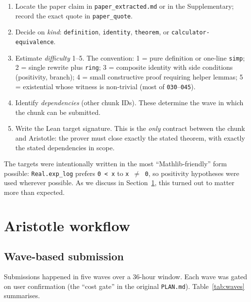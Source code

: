 \documentclass[11pt,a4paper]{article}
\theoremstyle{plain}
\theoremstyle{definition}
\begin{document}
\begin{enumerate}[leftmargin=*]
\item Locate the paper claim in \texttt{paper\_extracted.md} or in the
Supplementary; record the exact quote in \texttt{paper\_quote}.
\item Decide on \emph{kind}: \texttt{definition},
\texttt{identity}, \texttt{theorem}, or
\texttt{calculator-equivalence}.
\item Estimate \emph{difficulty} 1--5.  The convention: 1 = pure
definition or one-line \texttt{simp}; 2 = single rewrite plus
\texttt{ring}; 3 = composite identity with side conditions
(positivity, branch); 4 = small constructive proof requiring helper
lemmas; 5 = existential whose witness is non-trivial (most of
\texttt{030}--\texttt{045}).
\item Identify \emph{dependencies} (other chunk IDs).  These determine
the wave in which the chunk can be submitted.
\item Write the Lean target signature.  This is the \emph{only} contract
between the chunk and Aristotle: the prover must close exactly the
stated theorem, with exactly the stated dependencies in scope.
\end{enumerate}

The targets were intentionally written in the most ``Mathlib-friendly''
form possible: \texttt{Real.exp\_log} prefers \texttt{0\,<\,x} to
\texttt{x\,$\neq$\,0}, so positivity hypotheses were used wherever
possible.  As we discuss in Section~\ref{sec:aristotle}, this turned
out to matter more than expected.

\section{Aristotle workflow}\label{sec:aristotle}

\subsection{Wave-based submission}

Submissions happened in five waves over a 36-hour window.  Each wave was
gated on user confirmation (the ``cost gate'' in the original
\texttt{PLAN.md}).  Table~\ref{tab:waves} summarises.
\end{document}
